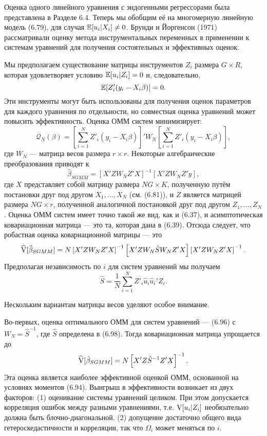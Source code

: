 Оценка одного линейного уравнения с эндогенными регрессорами была представлена в Разделе 6.4. Теперь мы обобщим её на многомерную линейную модель (6.79), для случая $\mathbb{E}[u_i|X_i] \not= 0$. Брунди и Йоргенсон (1971) рассматривали оценку метода инструментальных переменных в применении к системам уравнений для получения состоятельных и эффективных оценок.

Мы предполагаем существование матрицы инструментов $Z_i$ размера $G \times R$, которая удовлетворяет условию $\mathbb{E}[u_i|Z_i] = 0$ и, следовательно,
\begin{equation}
\mathbb{E}[Z'_i(y_i -X_i \beta)]=0.
\end{equation}
Эти инструменты могут быть использованы для получения оценок параметров для каждого уравнения по отдельности, но совместная оценка уравнений может повысить эффективность. Оценка ОММ систем минимизирует:
\begin{equation}
\mathcal{Q}_{N}(\beta)= \left[  \sum_{i=1}^{N} Z'_i(y_i -X_i \beta) \right]' W_N \left[  \sum_{i=1}^{N} Z'_i(y_i -X_i \beta) \right],
\end{equation}
где $W_N$ --- матрица весов размера $r \times r$. Некоторые алгебраические преобразования приводят к
\begin{equation}
\hat{\beta}_{SGMM}=[X' Z W_N Z' X]^{-1} [X' Z W_N Z' y],
\end{equation}
где $X$ представляет собой матрицу размера $NG \times K$, полученную путём постановки друг под другом $X_1, \dots, X_N$ (см. (6.81)), и $Z$ является матрицей размера $NG \times r$, полученной аналогичной постановкой друг под другом $Z_1, \dots, Z_N$. Оценка ОММ систем имеет точно такой же вид, как и (6.37), и асимптотическая ковариационная матрица --- это та, которая дана в (6.39). Отсюда следует, что робастная оценка ковариационной матрицы --- это
\begin{equation}
\widehat{\mathrm{V}}[\hat{\beta}_{SGMM}]= N \left[ X' Z W_N Z' X \right]^{-1} \left[ X' Z W_N \hat{S} W_N Z' X \right] \left[ X' Z W_N Z' X \right]^{-1}.
\end{equation}
Предполагая независимость по $i$ для систем уравнений мы получаем
\begin{equation}
\hat{S}= \frac{1}{N} \sum_{i=1}^{N} Z'_i \hat{u}_i \hat{u}_i' Z_i.
\end{equation}

Нескольким вариантам матрицы весов уделяют особое внимание.

Во-первых, оценка оптимального ОММ для систем уравнений --- (6.96) с $W_N={\hat{S}}^{-1}$, где $\hat{S}$ определена в (6.98). Тогда ковариационная матрица упрощается до
\[
\widehat{\mathrm{V}}[\hat{\beta}_{SGMM}]= N \left[ X' Z  {\hat{S}}^{-1} Z' X \right]^{-1}.
\]
Эта оценка является наиболее эффективной оценкой ОММ, основанной на условиях моментов (6.94). Выигрыш в эффективности возникает из двух факторов: (1) оценивание системы уравнений целиком. При этом допускается корреляция ошибок между разными уравнениями, т.е. $\mathrm{V}[u_i|Z_i]$ необязательно должна быть блочно-диагональной. (2) допущение достаточно общего вида гетероскедастичности и корреляции, так что $\Omega_i$ может меняться по $i$.


